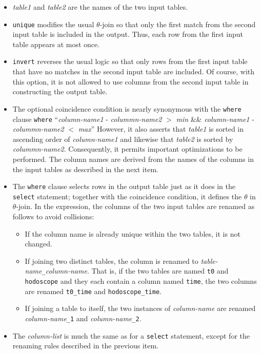 \documentclass[12pt]{article}
\begin{document}
\begin{itemize}
\item {\em table1} and {\em table2} are the names of the two input tables.
\item {\tt unique} modifies the usual $\theta$-join so that only the 
  first match from the second input table is included in the output.  
  Thus, each row from the first input table appears at most once.
\item {\tt invert} reverses the usual logic so that only rows from the 
  first input table that have no matches in the second input table are 
  included.  Of course, with this option, it is not allowed to use columns
  from the second input table in constructing the output table.
\item The optional coincidence condition is nearly synonymous with 
  the {\tt where} clause
  {\tt where} ``{\em column-name1} - {\em colummn-name2} $>$ {\em min} \&\& {\em column-name1} - {\em colummn-name2} $<$ {\em max}''
However, it also asserts that {\em table1} is sorted in ascending order of
{\em column-name1} and likewise that {\em table2} is sorted by 
{\em colummn-name2}.  Consequently, it permits important optimizations
to be performed.  The column names are derived from the names of the columns
in the input tables as described in the next item.
\item The {\tt where} clause selects rows in the output table just as it 
does in the {\tt select} statement; together with the coincidence condition, 
it defines the $\theta$ in $\theta$-join.  In the expression, the columns 
of the two input tables are renamed as follows to avoid collisions:
\begin{itemize}
\item If the column name is already unique within the two tables, 
  it is not changed.
\item If joining two distinct tables, the column is renamed to 
  {\em table-name}{\tt \_}{\em column-name}.  That is, if the two tables are
  named {\tt t0} and {\tt hodoscope} and they each contain a column
  named {\tt time}, the two columns are renamed {\tt t0\_time} and 
  {\tt hodoscope\_time}.
\item If joining a table to itself, the two instances of {\em column-name} 
  are renamed {\em column-name}{\tt \_1} and {\em column-name}{\tt \_2}.
\end{itemize}
\item The {\em column-list} is much the same as for a {\tt select} 
  statement, except for the renaming rules described in the previous item.
\end{itemize}
\end{document}
